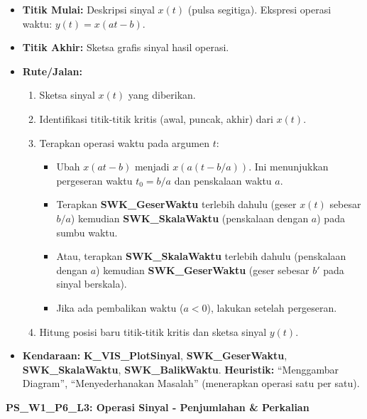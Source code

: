 \documentclass[
  letterpaper,
  DIV=11,
  numbers=noendperiod]{scrreprt}
\providecommand{\tightlist}{%
  \setlength{\itemsep}{0pt}\setlength{\parskip}{0pt}}
\begin{document}
\begin{itemize}
\tightlist
\item
  \textbf{Titik Mulai:} Deskripsi sinyal \(x(t)\) (pulsa segitiga).
  Ekspresi operasi waktu: \(y(t) = x(at-b)\).
\item
  \textbf{Titik Akhir:} Sketsa grafis sinyal hasil operasi.
\item
  \textbf{Rute/Jalan:}

  \begin{enumerate}
  \def\labelenumi{\arabic{enumi}.}
  \tightlist
  \item
    Sketsa sinyal \(x(t)\) yang diberikan.
  \item
    Identifikasi titik-titik kritis (awal, puncak, akhir) dari \(x(t)\).
  \item
    Terapkan operasi waktu pada argumen \(t\):

    \begin{itemize}
    \tightlist
    \item
      Ubah \(x(at-b)\) menjadi \(x(a(t-b/a))\). Ini menunjukkan
      pergeseran waktu \(t_0 = b/a\) dan penskalaan waktu \(a\).
    \item
      Terapkan \textbf{SWK\_GeserWaktu} terlebih dahulu (geser \(x(t)\)
      sebesar \(b/a\)) kemudian \textbf{SWK\_SkalaWaktu} (penskalaan
      dengan \(a\)) pada sumbu waktu.
    \item
      Atau, terapkan \textbf{SWK\_SkalaWaktu} terlebih dahulu
      (penskalaan dengan \(a\)) kemudian \textbf{SWK\_GeserWaktu} (geser
      sebesar \(b'\) pada sinyal berskala).
    \item
      Jika ada pembalikan waktu (\(a<0\)), lakukan setelah pergeseran.
    \end{itemize}
  \item
    Hitung posisi baru titik-titik kritis dan sketsa sinyal \(y(t)\).
  \end{enumerate}
\item
  \textbf{Kendaraan:} \textbf{K\_VIS\_PlotSinyal},
  \textbf{SWK\_GeserWaktu}, \textbf{SWK\_SkalaWaktu},
  \textbf{SWK\_BalikWaktu}. \textbf{Heuristik:} ``Menggambar Diagram'',
  ``Menyederhanakan Masalah'' (menerapkan operasi satu per satu).
\end{itemize}

\textbf{PS\_W1\_P6\_L3: Operasi Sinyal - Penjumlahan \& Perkalian}
\end{document}
